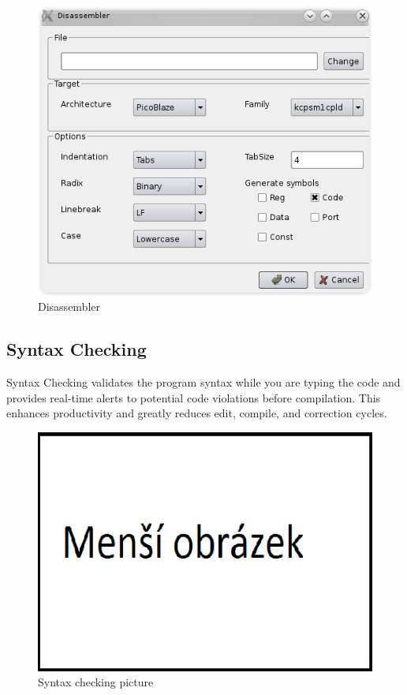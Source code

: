                     \begin{figure}
                        \centering{}
                        \includegraphics [scale=1]{img/disassembler_window.png}
                        \caption{Disassembler}
                    \end{figure}

                \subsection{Syntax Checking}
                    Syntax Checking validates the program syntax while you are typing
                    the code and provides real-time alerts to potential code violations
                    before compilation. This enhances productivity and greatly reduces
                    edit, compile, and correction cycles.
                    \begin{figure}
                        \centering{}
                        \includegraphics [scale=0.3]{img/mensi_obrazek.png}
                        \caption{Syntax checking picture}
                    \end{figure}

